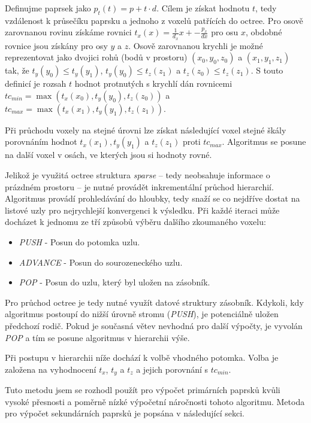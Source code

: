 Definujme paprsek jako $p_t(t) = p + t\cdot d$. Cílem je získat hodnotu $t$, tedy vzdálenost k průsečíku paprsku a jednoho z voxelů patřících do octree. Pro osově zarovnanou rovinu získáme rovnici $t_x(x) = \frac{1}{d_x}x + -\frac{p_x}{dx}$ pro osu $x$, obdobné rovnice jsou získány pro osy $y$ a $z$. Osově zarovnanou krychli je možné reprezentovat jako dvojici rohů (bodů v prostoru) $(x_0, y_0, z_0)$ a $(x_1, y_1, z_1)$ tak, že $t_y(y_0) \leq t_y(y_1)$, $t_y(y_0) \leq t_z(z_1)$ a $t_z(z_0) \leq t_z(z_1)$. S touto definicí je rozsah $t$ hodnot protnutých s krychlí dán rovnicemi $tc_{min} = \max(t_x(x_0), t_y(y_0), t_z(z_0))$ a $tc_{max} = \max(t_x(x_1), t_y(y_1), t_z(z_1))$.

Při průchodu voxely na stejné úrovni lze získat následující voxel stejné škály porovnáním hodnot $t_x(x_1), t_y(y_1)$ a $t_z(z_1)$ proti $tc_{max}$. Algoritmus se posune na další voxel v osách, ve kterých jsou si hodnoty rovné.

Jelikož je využitá octree struktura \textit{sparse} -- tedy neobsahuje informace o prázdném prostoru -- je nutné provádět inkrementální průchod hierarchií. Algoritmus provádí prohledávání do hloubky, tedy snaží se co nejdříve dostat na listové uzly pro nejrychlejší konvergenci k výsledku. Při každé iteraci může docházet k jednomu ze tří způsobů výběru dalšího zkoumaného voxelu:

\begin{itemize}
    \item \textit{PUSH} - Posun do potomka uzlu.
    \item \textit{ADVANCE} - Posun do sourozeneckého uzlu.
    \item \textit{POP} - Posun do uzlu, který byl uložen na zásobník.
\end{itemize}

Pro průchod octree je tedy nutné využít datové struktury zásobník. Kdykoli, kdy algoritmus postoupí do nižší úrovně stromu (\textit{PUSH}), je potenciálně uložen předchozí rodič. Pokud je současná větev nevhodná pro další výpočty, je vyvolán \textit{POP} a tím se posune algoritmus v hierarchii výše. 

Při postupu v hierarchii níže dochází k volbě vhodného potomka. Volba je založena na vyhodnocení $t_x$, $t_y$ a $t_z$ a jejich porovnání s $tc_{min}$.

Tuto metodu jsem se rozhodl použít pro výpočet primárních paprsků kvůli vysoké přesnosti a poměrně nízké výpočetní náročnosti tohoto algoritmu. Metoda pro výpočet sekundárních paprsků je popsána v následující sekci.

